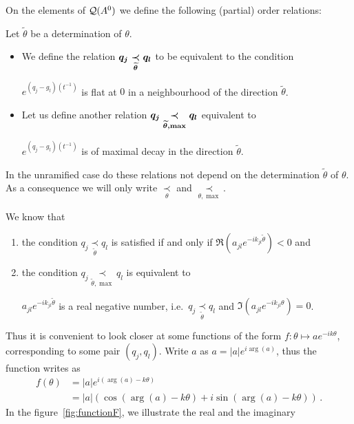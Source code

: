 On the elements of $\cQ(A^0)$ we define the following (partial) order
relations:
\begin{defn}
  Let $\tilde\theta$ be a determination of $\theta$.
  \begin{itemize}
    \item We define the relation
      $\boldmath q_j \underset{\tilde\theta}{\prec} q_l$ to be equivalent to
      the condition
      \begin{einr}
        $e^{(q_j-g_l)(t^{-1})}$ is flat at $0$ in a neighbourhood of the
        direction $\tilde\theta$.
      \end{einr}
    \item Let us define another relation
      $\boldmath q_j \underset{\tilde\theta,\max}{\prec} q_l$ equivalent to
      \begin{einr}
        $e^{(q_j-g_l)(t^{-1})}$ is of maximal decay in the direction
        $\tilde\theta$.
      \end{einr}
  \end{itemize}
  \begin{s-rem}
    In the unramified case do these relations not depend on the determination
    $\tilde\theta$ of $\theta$. As a consequence we will only write
    $\underset{\theta}{\prec}$ and $\underset{\theta,\max}{\prec}$.
  \end{s-rem}
\end{defn}
We know that
\begin{enumerate}
  \item the condition $q_j \underset{\tilde\theta}{\prec} q_l$ is
    satisfied if and only if $\Re(a_{jl}e^{-ik_{jl}\tilde\theta})<0$ and
  \item the condition $q_j \underset{\tilde\theta,\max}{\prec} q_l$ is
    equivalent to
    \begin{einr}
      $a_{jl}e^{-ik_{jl}\tilde\theta}$ is a real negative
      number, i.e.\ $q_j \underset{\tilde\theta}{\prec} q_l$ and
      $\Im(a_{jl}e^{-ik_{jl}\theta})=0$.
    \end{einr}
\end{enumerate}
Thus it is convenient to look closer at some functions of the form
$f:\theta\mapsto ae^{-ik\theta}$, corresponding to some pair $(q_j,q_l)$.
Write $a$ as $a=|a|e^{i\arg(a)}$, thus the function writes as
\begin{align*}
  f(\theta)&=|a|e^{i(\arg(a)-k\theta)}
  \\&=|a|(\cos(\arg(a)-k\theta) + i\sin(\arg(a)-k\theta)) \,.
\end{align*}
In the figure~\ref{fig:functionF}, we illustrate the real and the imaginary
